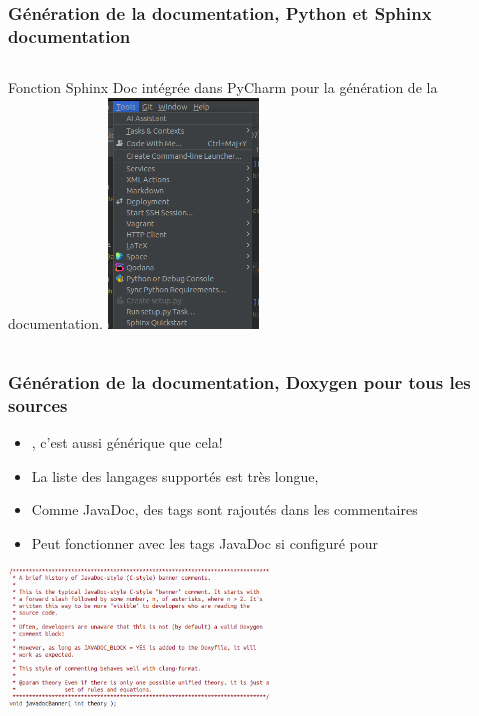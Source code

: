 \documentclass{beamer}
\begin{document}
    \begin{frame}
        \transdissolve
        \frametitle{Génération de la documentation, Python et Sphinx documentation}
        \begin{columns}
            Fonction Sphinx Doc intégrée dans PyCharm pour la génération de la documentation.
            \centering
            \includegraphics[width=4cm]{image/sphinx-generate-button.png}
        \end{columns}
    \end{frame}

    \begin{frame}
        \transdissolve
        \frametitle{Génération de la documentation, Doxygen pour tous les sources}

        \begin{itemize}

            \item {}, c'est aussi générique que cela! 
            \item La liste des langages supportés est très longue, 
            \item Comme JavaDoc, des tags sont rajoutés dans les commentaires
            \item Peut fonctionner avec les tags JavaDoc si configuré pour

        \end{itemize}
        \bigbreak

        \centering
        \includegraphics[width=7cm]{image/javadoc-with-doxygen.png}

    \end{frame}
\end{document}
